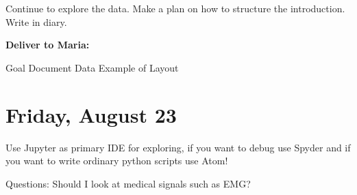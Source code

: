 \documentclass[11pt,letterpaper]{article}
\begin{document}
Continue to explore the data.
Make a plan on how to structure the introduction.
Write in diary.

\textbf{Deliver to Maria:}

Goal Document
Data
Example of Layout

\section*{Friday, August 23}

Use Jupyter as primary IDE for exploring, if you want to debug use Spyder and if you want to write ordinary python scripts use Atom!

Questions:
Should I look at medical signals such as EMG?

\printbibliography 
\end{document}
